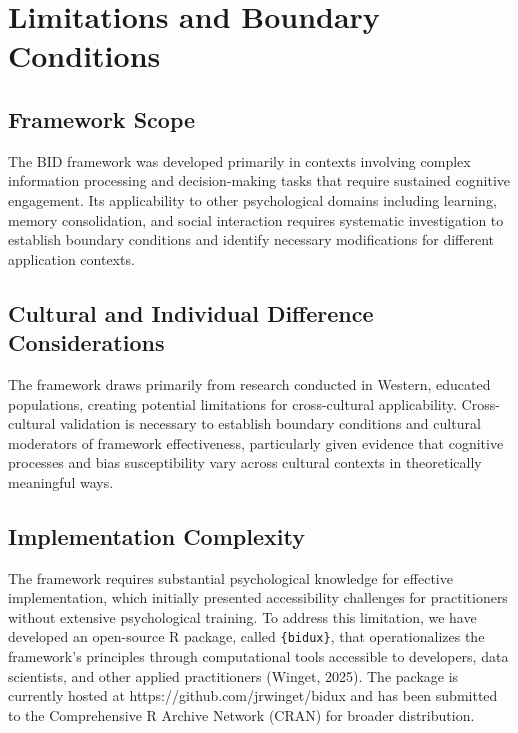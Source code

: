 \documentclass[
  authoryear,
  preprint]{elsarticle}
\begin{document}
\section{Limitations and Boundary
Conditions}\label{limitations-and-boundary-conditions}

\subsection{Framework Scope}\label{framework-scope}

The BID framework was developed primarily in contexts involving complex
information processing and decision-making tasks that require sustained
cognitive engagement. Its applicability to other psychological domains
including learning, memory consolidation, and social interaction
requires systematic investigation to establish boundary conditions and
identify necessary modifications for different application contexts.

\subsection{Cultural and Individual Difference
Considerations}\label{cultural-and-individual-difference-considerations}

The framework draws primarily from research conducted in Western,
educated populations, creating potential limitations for cross-cultural
applicability. Cross-cultural validation is necessary to establish
boundary conditions and cultural moderators of framework effectiveness,
particularly given evidence that cognitive processes and bias
susceptibility vary across cultural contexts in theoretically meaningful
ways.

\subsection{Implementation Complexity}\label{implementation-complexity}

The framework requires substantial psychological knowledge for effective
implementation, which initially presented accessibility challenges for
practitioners without extensive psychological training. To address this
limitation, we have developed an open-source R package, called
\texttt{\{bidux\}}, that operationalizes the framework's principles
through computational tools accessible to developers, data scientists,
and other applied practitioners (Winget, 2025). The package is currently
hosted at https://github.com/jrwinget/bidux and has been submitted to
the Comprehensive R Archive Network (CRAN) for broader distribution.
\end{document}
